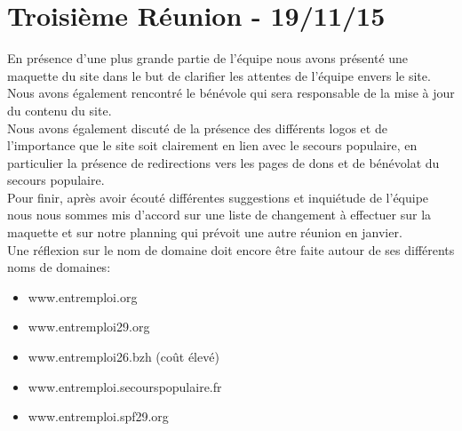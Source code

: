\documentclass[12pt]{report}
\begin{document}
\section{Troisième Réunion - 19/11/15}
En présence d'une plus grande partie de l'équipe nous avons présenté une maquette du site dans le but de clarifier les attentes de l'équipe envers le site. Nous avons également rencontré le bénévole qui sera responsable de la mise à jour du contenu du site.\\
Nous avons également discuté de la présence des différents logos et de l'importance que le site soit clairement en lien avec le secours populaire, en particulier la présence de redirections vers les pages de dons et de bénévolat du secours populaire.\\
Pour finir, après avoir écouté différentes suggestions et inquiétude de l'équipe nous nous sommes mis d'accord sur une liste de changement à effectuer sur la maquette et sur notre planning qui prévoit une autre réunion en janvier.\\
Une réflexion sur le nom de domaine doit encore être faite autour de ses différents noms de domaines:
\begin{itemize}
    \item www.entremploi.org 
    \item www.entremploi29.org
    \item www.entremploi26.bzh (coût élevé)
    \item www.entremploi.secourspopulaire.fr
    \item www.entremploi.spf29.org
\end{itemize}
\end{document}
